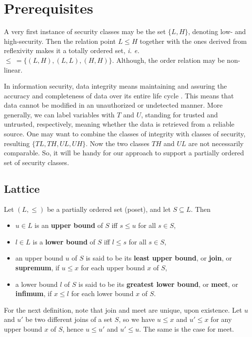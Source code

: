 \documentclass{llncs}
\begin{document}
\section{Prerequisites}

A very first instance of security classes may be the set $\{L, H\}$, denoting low- and high-security. Then the relation point $L \leq H$ together with the ones derived from reflexivity makes it a totally ordered set, \textit{i. e.} $\leq\ = \{(L, H), (L, L), (H, H)\}$. Although, the order relation may be non-linear. 

In information security, data integrity means maintaining and assuring the accuracy and completeness of data over its entire life cycle \cite{Boritz2005}. This means that data cannot be modified in an unauthorized or undetected manner. More generally, we can label variables with $T$ and $U$, standing for trusted and untrusted, respectively, meaning whether the data is retrieved from a reliable source.
One may want to combine the classes of integrity with classes of security, resulting $\{TL, TH, UL, UH\}$. Now the two classes $TH$ and $UL$ are not necessarily comparable. So, it will be handy for our approach to support a partially ordered set of security classes.

\subsection{Lattice}

\begin{definition}
Let $(L, \leq)$ be a partially ordered set (poset), and let $S \subseteq L$. Then
\begin{itemize}
    \item $u \in L$ is an \textbf{upper bound} of $S$ iff $s \leq u$ for all $s \in S$,
    \item $l \in L$ is a \textbf{lower bound} of $S$ iff $l \leq s$ for all $s \in S$,\
    \item an upper bound $u$ of $S$ is said to be its \textbf{least upper bound}, or \textbf{join}, or \textbf{supremum}, if $u \leq x$ for each upper bound $x$ of $S$,
    \item a lower bound $l$ of $S$ is said to be its \textbf{greatest lower bound}, or \textbf{meet}, or \textbf{infimum}, if $x \leq l$ for each lower bound $x$ of $S$.
\end{itemize}
\end{definition}

For the next definition, note that join and meet are unique, upon existence. Let $u$ and $u'$ be two different joins of a set $S$, so we have $u \leq x$ and $u' \leq x$ for any upper bound $x$ of $S$, hence $u \leq u'$ and $u' \leq u$. The same is the case for meet.
\end{document}
